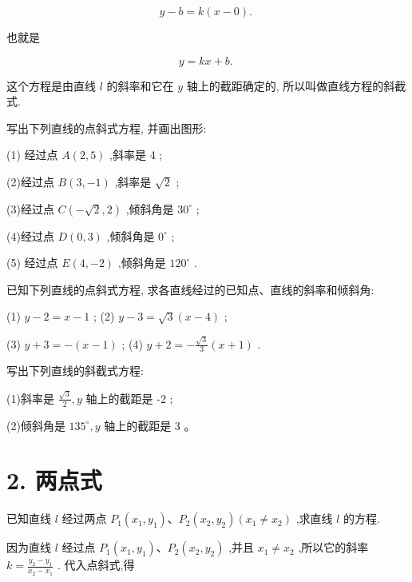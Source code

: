 \documentclass[lang=cn,newtx,10pt,scheme=chinese]{elegantbook}
\begin{document}
\[
  y - b = k\left( {x - 0}\right) \text{. }
\]

也就是
\begin{corollary}[斜截式]
\[
  y = {kx} + b\text{. }
\]
\end{corollary}
这个方程是由直线 \(l\) 的斜率和它在 \(y\) 轴上的截距确定的, 所以叫做直线方程的斜截式.

\begin{problemset}[练习]

\item 写出下列直线的点斜式方程, 并画出图形:

(1) 经过点 \(A\left( {2,5}\right)\) ,斜率是 4 ;

(2)经过点 \(B\left( {3, - 1}\right)\) ,斜率是 \(\sqrt{2}\) ;

(3)经过点 \(C\left( {-\sqrt{2},2}\right)\) ,倾斜角是 \({30}^{ \circ }\) ;

(4)经过点 \(D\left( {0,3}\right)\) ,倾斜角是 \({0}^{ \circ }\) ;

(5) 经过点 \(E\left( {4, - 2}\right)\) ,倾斜角是 \({120}^{ \circ }\) .

\item 已知下列直线的点斜式方程, 求各直线经过的已知点、直线的斜率和倾斜角:


(1) \(y - 2 = x - 1\) ; (2) \(y - 3 = \sqrt{3}\left( {x - 4}\right)\) ;


(3) \(y + 3 = - \left( {x - 1}\right)\) ; (4) \(y + 2 = - \frac{\sqrt{3}}{3}\left( {x + 1}\right)\) .

\item 写出下列直线的斜截式方程:

(1)斜率是 \(\frac{\sqrt{3}}{2},y\) 轴上的截距是 -2 ;

(2)倾斜角是 \({135}^{ \circ },y\) 轴上的截距是 3 。
\end{problemset}

\section*{2. 两点式}

已知直线 \(l\) 经过两点 \({P}_{1}\left( {{x}_{1},{y}_{1}}\right) \text{、}{P}_{2}\left( {{x}_{2},{y}_{2}}\right) \left( {{x}_{1} \neq {x}_{2}}\right)\) ,求直线 \(l\) 的方程.

因为直线 \(l\) 经过点 \({P}_{1}\left( {{x}_{1},{y}_{1}}\right) \text{、}{P}_{2}\left( {{x}_{2},{y}_{2}}\right)\) ,并且 \({x}_{1} \neq {x}_{2}\) ,所以它的斜率 \(k = \frac{{y}_{2} - {y}_{1}}{{x}_{2} - {x}_{1}}\) . 代入点斜式,得
\end{document}
